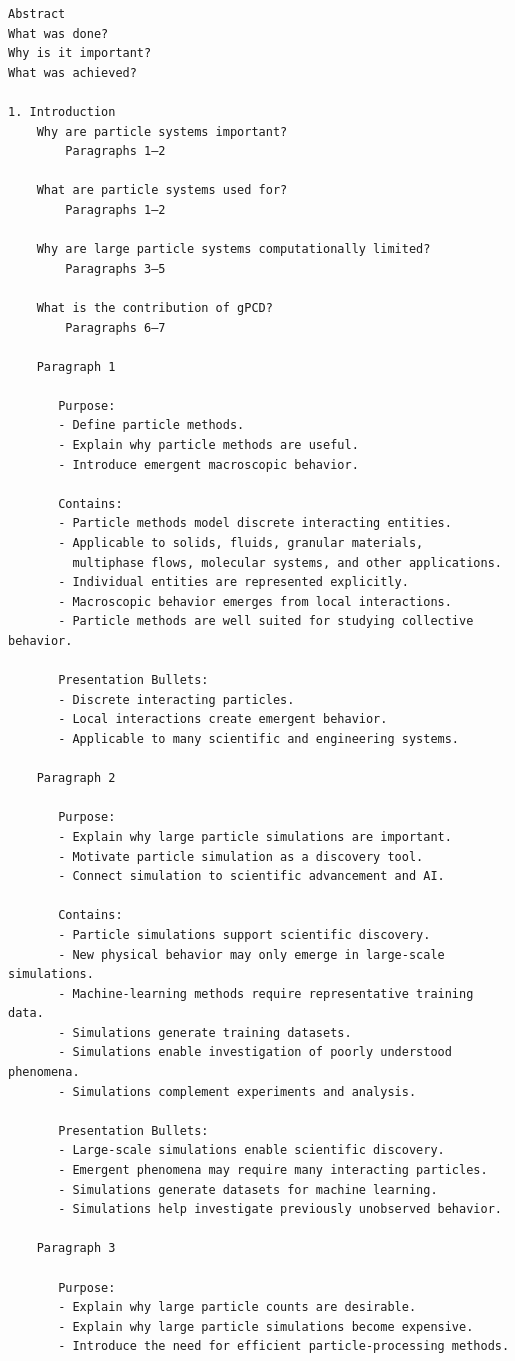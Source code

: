 \begin{verbatim}
Abstract
What was done?
Why is it important?
What was achieved?

1. Introduction
	Why are particle systems important?
		Paragraphs 1–2

	What are particle systems used for?
		Paragraphs 1–2

	Why are large particle systems computationally limited?
		Paragraphs 3–5

	What is the contribution of gPCD?
		Paragraphs 6–7

	Paragraph 1

	   Purpose:
	   - Define particle methods.
	   - Explain why particle methods are useful.
	   - Introduce emergent macroscopic behavior.

	   Contains:
	   - Particle methods model discrete interacting entities.
	   - Applicable to solids, fluids, granular materials,
		 multiphase flows, molecular systems, and other applications.
	   - Individual entities are represented explicitly.
	   - Macroscopic behavior emerges from local interactions.
	   - Particle methods are well suited for studying collective behavior.

	   Presentation Bullets:
	   - Discrete interacting particles.
	   - Local interactions create emergent behavior.
	   - Applicable to many scientific and engineering systems.

	Paragraph 2

	   Purpose:
	   - Explain why large particle simulations are important.
	   - Motivate particle simulation as a discovery tool.
	   - Connect simulation to scientific advancement and AI.

	   Contains:
	   - Particle simulations support scientific discovery.
	   - New physical behavior may only emerge in large-scale simulations.
	   - Machine-learning methods require representative training data.
	   - Simulations generate training datasets.
	   - Simulations enable investigation of poorly understood phenomena.
	   - Simulations complement experiments and analysis.

	   Presentation Bullets:
	   - Large-scale simulations enable scientific discovery.
	   - Emergent phenomena may require many interacting particles.
	   - Simulations generate datasets for machine learning.
	   - Simulations help investigate previously unobserved behavior.

	Paragraph 3

	   Purpose:
	   - Explain why large particle counts are desirable.
	   - Explain why large particle simulations become expensive.
	   - Introduce the need for efficient particle-processing methods.


\end{verbatim}
